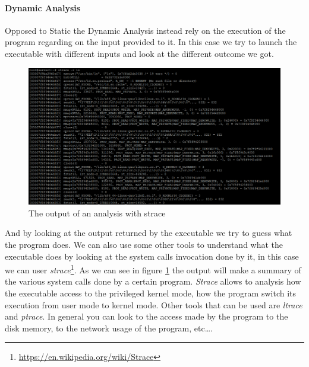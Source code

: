 \documentclass{article}
\begin{document}
\paragraph{Dynamic Analysis}
Opposed to Static the Dynamic Analysis instead rely on the execution of the program regarding on the input provided to it. In this case we try to launch the executable with different inputs and look at the different outcome we got.
\begin{figure}[htp]
    \centering
    \includegraphics[width=1\textwidth]{images/strace.png}
    \caption{The output of an analysis with strace}
    \label{fig:strace}
\end{figure}
And by looking at the output returned by the executable we try to guess what the program does. We can also use some other tools to understand what the executable does by looking at the system calls invocation done by it, in this case we can user \textit{strace}\footnote{\url{https://en.wikipedia.org/wiki/Strace}}. As we can see in figure \ref{fig:strace} the output will make a summary of the various system calls done by a certain program.
\textit{Strace} allows to analysis how the executable access to the privileged kernel mode, how the program switch its execution from user mode to kernel mode. Other tools that can be used are \textit{ltrace} and \textit{ptrace}. In general you can look to the access made by the program to the disk memory, to the network usage of the program, etc\dots.
\end{document}
